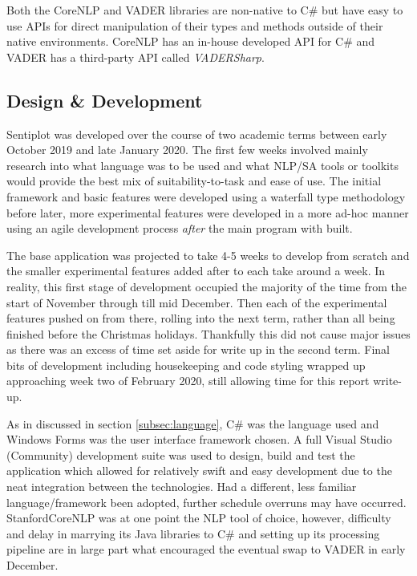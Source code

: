 \documentclass{article}
\begin{document}
        Both the CoreNLP and VADER libraries are non-native to C\# but have easy to use APIs for direct manipulation of their types and methods outside of their native environments. CoreNLP has an in-house developed API for C\# and VADER has a third-party API called \textit{VADERSharp}.
    \subsection{Design \& Development}
    \label{subsec:dnd}
        Sentiplot was developed over the course of two academic terms between early October 2019 and late January 2020. The first few weeks involved mainly research into what language was to be used and what NLP/SA tools or toolkits would provide the best mix of suitability-to-task and ease of use. The initial framework and basic features were developed using a waterfall type methodology before later, more experimental features were developed in a more ad-hoc manner using an agile development process \textit{after} the main program with built.
        
        The base application was projected to take 4-5 weeks to develop from scratch and the smaller experimental features added after to each take around a week. In reality, this first stage of development occupied the majority of the time from the start of November through till mid December. Then each of the experimental features pushed on from there, rolling into the next term, rather than all being finished before the Christmas holidays. Thankfully this did not cause major issues as there was an excess of time set aside for write up in the second term. Final bits of development including housekeeping and code styling wrapped up approaching week two of February 2020, still allowing time for this report write-up.

        As in discussed in section \ref{subsec:language}, C\# was the language used and Windows Forms was the user interface framework chosen. A full Visual Studio (Community) development suite was used to design, build and test the application which allowed for relatively swift and easy development due to the neat integration between the technologies. Had a different, less familiar language/framework been adopted, further schedule overruns may have occurred. StanfordCoreNLP was at one point the NLP tool of choice, however, difficulty and delay in marrying its Java libraries to C\# and setting up its processing pipeline are in large part what encouraged the eventual swap to VADER in early December.
        
\end{document}
